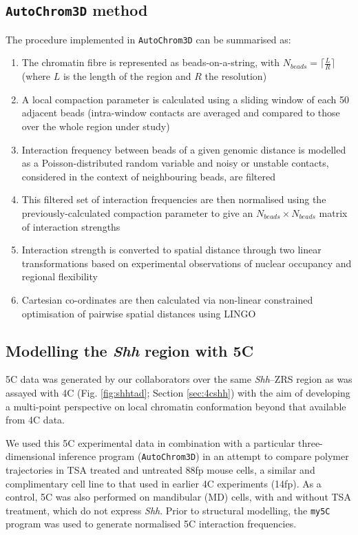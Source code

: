 \documentclass[a4paper,11pt,oneside]{book}
\begin{document}
\subsection{\texttt{AutoChrom3D} method}\label{sec:achrom}

The procedure implemented in \texttt{AutoChrom3D} can be summarised as:\cite{Peng2013}

\begin{enumerate}
\item The chromatin fibre is represented as beads-on-a-string, with $N_{beads} = \lceil\frac{L}{R}\rceil$ (where $L$ is the length of the region and $R$ the resolution)
\item A local compaction parameter is calculated using a sliding window of each 50 adjacent beads (intra-window contacts are averaged and compared to those over the whole region under study)
\item Interaction frequency between beads of a given genomic distance is modelled as a Poisson-distributed random variable and noisy or unstable contacts, considered in the context of neighbouring beads, are filtered
\item This filtered set of interaction frequencies are then normalised using the previously-calculated compaction parameter to give an $N_{beads} \times N_{beads}$ matrix of interaction strengths
\item Interaction strength is converted to spatial distance through two linear transformations based on experimental observations of nuclear occupancy and regional flexibility\cite{Kalhor2012}
\item Cartesian co-ordinates are then calculated via non-linear constrained optimisation of pairwise spatial distances using LINGO\cite{lingo}
\end{enumerate}

\subsection{Modelling the \emph{Shh} region with 5C}\label{sec:shh5c}

5C data was generated by our collaborators over the same \emph{Shh}--ZRS region as was assayed with 4C (Fig. \ref{fig:shhtad}; Section \ref{sec:4cshh}) with the aim of developing a multi-point perspective on local chromatin conformation beyond that available from 4C data.

We used this 5C experimental data in combination with a particular three-dimensional inference program  (\texttt{AutoChrom3D}\cite{Peng2013}) in an attempt to compare polymer trajectories in TSA treated and untreated 88fp mouse cells, a similar and complimentary cell line to that used in earlier 4C experiments (14fp). As a control, 5C was also performed on mandibular (MD) cells, with and without TSA treatment, which do not express \emph{Shh}. Prior to structural modelling, the \texttt{my5C} program was used to generate normalised 5C interaction frequencies.\cite{Lajoie2009a}
\end{document}
